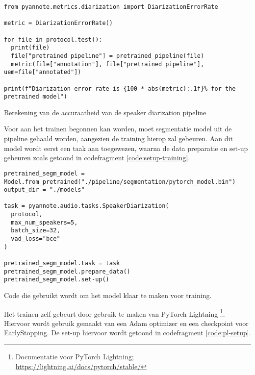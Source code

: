 \begin{listing}
	\begin{verbatim}
from pyannote.metrics.diarization import DiarizationErrorRate

metric = DiarizationErrorRate()

for file in protocol.test():
  print(file)
  file["pretrained pipeline"] = pretrained_pipeline(file)
  metric(file["annotation"], file["pretrained pipeline"], uem=file["annotated"])

print(f"Diarization error rate is {100 * abs(metric):.1f}% for the pretrained model")
	\end{verbatim}
	\caption[Berekening DER met pyannote-metrics]{\label{code:pyannote-metrics}Berekening van de accuraatheid van de speaker diarization pipeline}
\end{listing}

Voor aan het trainen begonnen kan worden, moet segmentatie model uit de pipeline gehaald worden, aangezien de training hierop zal gebeuren. Aan dit model wordt eerst een taak aan toegewezen, waarna de data preparatie en set-up gebeuren zoals getoond in codefragment \ref{code:setup-training}.

\begin{listing}
	\begin{verbatim}
pretrained_segm_model = Model.from_pretrained("./pipeline/segmentation/pytorch_model.bin")
output_dir = "./models"

task = pyannote.audio.tasks.SpeakerDiarization(
  protocol,
  max_num_speakers=5,
  batch_size=32,
  vad_loss="bce"
)

pretrained_segm_model.task = task
pretrained_segm_model.prepare_data()
pretrained_segm_model.set-up()
	\end{verbatim}
	\caption[Model klaarmaken voor training]{\label{code:setup-training}Code die gebruikt wordt om het model klaar te maken voor training.}
\end{listing}

Het trainen zelf gebeurt door gebruik te maken van PyTorch Lightning \footnote{Documentatie voor PyTorch Lightning; \url{https://lightning.ai/docs/pytorch/stable/}}. Hiervoor wordt gebruik gemaakt van een Adam optimizer en een checkpoint voor EarlyStopping. De set-up hiervoor wordt getoond in codefragment \ref{code:pl-setup}.

